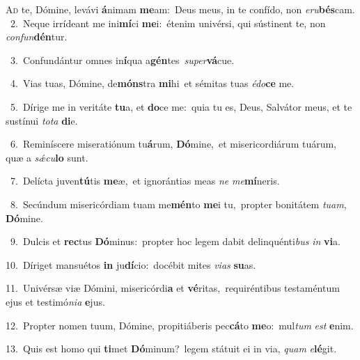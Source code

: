 \lettrine{\initial\textcolor{\initialcolor}{A}}{d} te, Dómine, levávi \textbf{á}\-nimam \textbf{me}\-am:~\star Deus meus, in te confído, non \textit{e}\-\textit{ru}\textbf{bés}cam.\\
{\numbfont\textcolor{\numbcolor}{~2.}}~Neque irrídeant me ini\-\textbf{mí}\-ci \textbf{me}\-i:~\star étenim univérsi, qui sústinent te, non \textit{con}\-\textit{fun}\textbf{dén}tur.\par
{\numbfont\textcolor{\numbcolor}{~3.}}~Confundántur omnes in\-\textbf{í}\-qua a\-\textbf{gén}\-tes~\star \textit{su}\-\textit{per}\textbf{vá}cue.\par
{\numbfont\textcolor{\numbcolor}{~4.}}~Vias tuas, Dómine, de\-\textbf{móns}\-tra \textbf{mi}\-hi~\star et sémitas tuas \textit{é}\-\textit{do}\textbf{ce} me.\par
{\numbfont\textcolor{\numbcolor}{~5.}}~Dírige me in veritáte \textbf{tu}\-a, et \textbf{do}\-ce me:~\star quia tu es, Deus, Salvátor meus, et te sustínui \textit{to}\-\textit{ta} \textbf{di}\-e.\par
{\numbfont\textcolor{\numbcolor}{~6.}}~Reminíscere miseratiónum tu\-\textbf{á}\-rum, \textbf{Dó}\-mine,~\star et misericordiárum tuárum, quæ a \textit{sǽ}\-\textit{cu}\textbf{lo} sunt.\par
{\numbfont\textcolor{\numbcolor}{~7.}}~Delícta juven\-\textbf{tú}\-tis \textbf{me}\-æ,~\star et ignorántias meas \textit{ne} \textit{me}\-\textbf{mí}neris.\par
{\numbfont\textcolor{\numbcolor}{~8.}}~Secúndum misericórdiam tuam me\-\textbf{mén}\-to \textbf{me}\-i tu,~\star propter bonitátem \textit{tu}\-\textit{am}, \textbf{Dó}\-mine.\par
{\numbfont\textcolor{\numbcolor}{~9.}}~Dulcis et \textbf{rec}\-tus \textbf{Dó}\-minus:~\star propter hoc legem dabit delinquénti\textit{bus} \textit{in} \textbf{vi}\-a.\par
{\numbfont\textcolor{\numbcolor}{10.}}~Díriget mansuétos \textbf{in} ju\-\textbf{dí}\-cio:~\star docébit mites \textit{vi}\-\textit{as} \textbf{su}\-as.\par
{\numbfont\textcolor{\numbcolor}{11.}}~Univérsæ viæ Dómini, misericórdi\textbf{a} et \textbf{vé}\-ritas,~\star requiréntibus testaméntum ejus et testimó\-\textit{ni}\-\textit{a} \textbf{e}\-jus.\par
{\numbfont\textcolor{\numbcolor}{12.}}~Propter nomen tuum, Dómine, propitiáberis pec\-\textbf{cá}\-to \textbf{me}\-o:~\star mul\textit{tum} \textit{est} \textbf{e}\-nim.\par
{\numbfont\textcolor{\numbcolor}{13.}}~Quis est homo qui \textbf{ti}\-met \textbf{Dó}\-minum?~\star legem státuit ei in via, \textit{quam} \textit{e}\-\textbf{lé}git.\par
